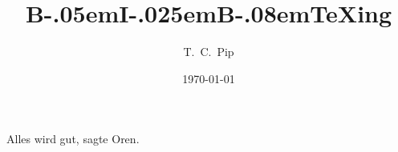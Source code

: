 \documentclass[12pt]{scrartcl}
\begin{document}
\title{B\kern-.05em{\large I}\kern-.025em{\large B}\kern-.08em\TeX ing}
\author{T.\ C.\ Pip}
\date{\today}
\maketitle

Alles wird gut, sagte Oren\cite{aaaa}.


\end{document}
